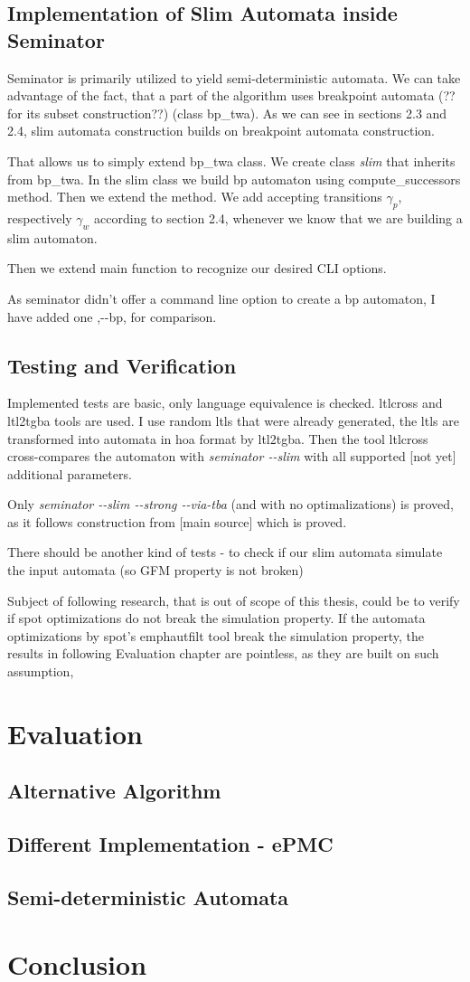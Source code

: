\documentclass[
	digital
nolof, nolot
]{fithesis3}
\begin{document}
	\section{Implementation of Slim Automata inside Seminator}
	Seminator is primarily utilized to yield semi-deterministic automata.
	We can take advantage of the fact, that a part of the algorithm uses breakpoint automata (??for its subset construction??) (class bp\_twa).
	As we can see in sections 2.3 and 2.4, slim automata construction builds on breakpoint automata construction.
	
	That allows us to simply extend bp\_twa class.
	We create class \emph{slim} that inherits from bp\_twa.
	In the slim class we build bp automaton using compute\_successors method.
	Then we extend the method. We add accepting transitions $\gamma_p$, respectively $\gamma_w$ according to section 2.4, whenever we know that we are building a slim automaton.
	
	Then we extend main function to recognize our desired CLI options.
	
	As seminator didn't offer a command line option to create a bp automaton, I have added one ,-{}-bp, for comparison.
	
	
	
	\section{Testing and Verification}
	Implemented tests are basic, only language equivalence is checked.
	ltlcross and ltl2tgba tools are used. I use random ltls that were already generated, the ltls are transformed into automata in hoa format by ltl2tgba.
	Then the tool ltlcross cross-compares the automaton with \emph{seminator -{}-slim} with all supported [not yet] additional parameters.
	
	Only \emph{seminator -{}-slim -{}-strong -{}-via-tba} (and with no optimalizations) is proved, as it follows construction from [main source] which is proved.
	
	There should be another kind of tests - to check if our slim automata simulate the input automata (so GFM property is not broken)
	
	Subject of following research, that is out of scope of this thesis, could be to verify if spot optimizations do not break the simulation property. If the automata optimizations by spot's 
	emph{autfilt} tool break the simulation property, the results in following Evaluation chapter are pointless, as they are built on such assumption,
	\chapter{Evaluation}
		\section{Alternative Algorithm}
		\section{Different Implementation - ePMC}
		\section{Semi-deterministic Automata}
	\chapter{Conclusion}
\end{document}
